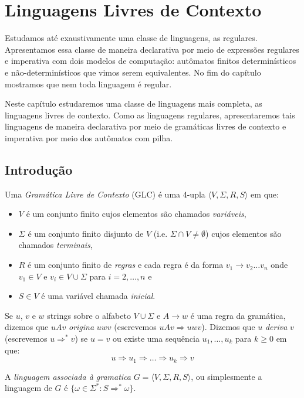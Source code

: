 \chapter{Linguagens Livres de Contexto}
\label{cha:ap}

Estudamos até exaustivamente uma classe de linguagens, as regulares.
Apresentamos essa classe de maneira declarativa por meio de expressões regulares e imperativa com dois modelos de computação: autômatos finitos determinísticos e não-determinísticos que vimos serem equivalentes.
No fim do capítulo mostramos que nem toda linguagem é regular.

Neste capítulo estudaremos uma classe de linguagens mais completa, as linguagens livres de contexto.
Como as linguagens regulares, apresentaremos tais linguagens de maneira declarativa por meio de gramáticas livres de contexto e imperativa por meio dos autômatos com pilha.

\section{Introdução}
\label{sec:llc}

Uma {\em Gramática Livre de Contexto} (GLC) é uma 4-upla $\langle V, \Sigma, R, S \rangle$ em que:
\begin{itemize}
\item[] $V$ é um conjunto finito cujos elementos são chamados {\em variáveis},
\item[] $\Sigma$ é um conjunto finito disjunto de $V$ (i.e. $\Sigma \cap V \neq \emptyset$) cujos elementos são chamados {\em terminais},
\item[] $R$ é um conjunto finito de {\em regras} e cada regra é da forma $v_1 \to v_2 \dots v_n$ onde $v_1 \in V$ e $v_i \in V \cup \Sigma$ para $i = 2, \dots, n$ e
\item[] $S \in V$ é uma variável chamada {\em inicial}.
\end{itemize}

Se $u$, $v$ e $w$ strings sobre o alfabeto $V \cup \Sigma$ e $A \to w$ é uma regra da gramática, dizemos que $uAv$ {\em origina} $uwv$ (escrevemos $uAv \Rightarrow uwv$).
Dizemos que $u$ {\em deriva} $v$ (escrevemos $u \Rightarrow^* v$) se $u = v$ ou existe uma sequência $u_1, \dots, u_k$ para $k \geq 0$ em que:
\begin{displaymath}
  u \Rightarrow u_1 \Rightarrow \dots \Rightarrow u_k \Rightarrow v
\end{displaymath}

A {\em linguagem associada à gramatica} $G = \langle V, \Sigma, R, S \rangle$, ou simplesmente a linguagem de $G$ é $\{\omega \in \Sigma^* : S \Rightarrow^* \omega \}$.

